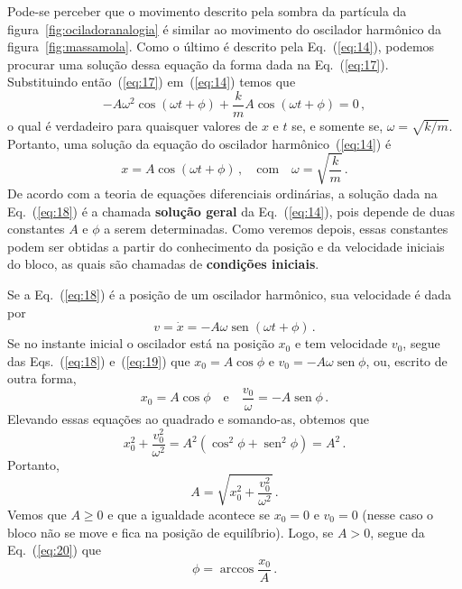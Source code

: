 \documentclass[12pt,a4paper]{article}
\theoremstyle{definition}
\DeclareMathOperator{\sen}{sen}
\begin{document}
Pode-se perceber que o movimento descrito pela sombra da partícula da
figura~\ref{fig:ociladoranalogia} é similar ao movimento do oscilador
harmônico da figura~\ref{fig:massamola}. Como o último é descrito pela
Eq.~(\ref{eq:14}), podemos procurar uma solução dessa equação da forma
dada na Eq.~(\ref{eq:17}). Substituindo então~(\ref{eq:17})
em~(\ref{eq:14}) temos que
$$-A\omega^2\cos(\omega t+\phi)+\frac{k}{m}A\cos(\omega t+\phi)=0\,,$$
o qual é verdadeiro para quaisquer valores de $x$ e $t$ se, e somente
se, $\omega=\sqrt{k/m}$. Portanto, uma solução da equação do oscilador
harmônico~(\ref{eq:14}) é
\begin{equation}
  \label{eq:18}
  x=A\cos(\omega t+\phi)\,,\quad \text{com}\quad \omega=\sqrt{\frac{k}{m}}\,.
\end{equation}
De acordo com a teoria de equações diferenciais ordinárias, a solução
dada na Eq.~(\ref{eq:18}) é a chamada \textbf{solução geral} da
Eq.~(\ref{eq:14}), pois depende de duas constantes $A$ e $\phi$ a
serem determinadas. Como veremos depois, essas constantes podem ser
obtidas a partir do conhecimento da posição e da velocidade iniciais
do bloco, as quais são chamadas de \textbf{condições iniciais}.

Se a Eq.~(\ref{eq:18}) é a posição de um oscilador harmônico, sua
velocidade é dada por
\begin{equation}
  \label{eq:19}
  v=\dot x=-A\omega\sen(\omega t+\phi)\,.
\end{equation}
Se no instante inicial o oscilador está na posição $x_0$ e tem
velocidade $v_0$, segue das Eqs.~(\ref{eq:18}) e~(\ref{eq:19}) que
$x_0=A\cos\phi$ e $v_0=-A\omega\sen\phi$, ou, escrito de outra forma,
\begin{equation}
  \label{eq:20}
  x_0=A\cos\phi\quad\text{e}\quad \frac{v_0}{\omega}=-A\sen\phi\,.
\end{equation}
Elevando essas equações ao quadrado e somando-as, obtemos que
$$x_0^2+\frac{v_0^2}{\omega^2}=A^2(\cos^2\phi+\sen^2\phi)=A^2\,.$$
Portanto,
\begin{equation}
  \label{eq:21}
  A=\sqrt{x_0^2+\frac{v_0^2}{\omega^2}}\,.
\end{equation}
Vemos que $A\ge 0$ e que a igualdade acontece se $x_0=0$ e $v_0=0$
(nesse caso o bloco não se move e fica na posição de
equilíbrio). Logo, se $A>0$, segue da Eq.~(\ref{eq:20}) que
$$\phi=\arccos\frac{x_0}{A}\,.$$
\end{document}
